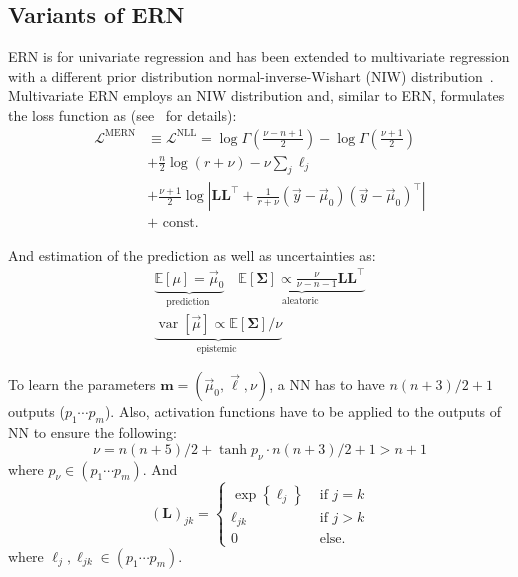 \subsection{Variants of ERN}
\label{sec:back:variant}
ERN is for univariate regression and has been extended to multivariate regression with a different prior distribution normal-inverse-Wishart (NIW) distribution~\cite{meinert2021multivariate}. Multivariate ERN employs an NIW distribution and, similar to ERN, formulates the loss function as (see~\citeauthor{meinert2021multivariate} for details):
\begin{equation}
\begin{aligned}
\mathcal{L}^{\mathrm{MERN}} & \equiv  \mathcal{L}^{\mathrm{NLL}}=  \log \Gamma\left(\frac{\nu-n+1}{2}\right)-\log \Gamma\left(\frac{\nu+1}{2}\right) \\
& +\frac{n}{2} \log \left(r+\nu\right)-\nu \sum_j \ell_j \\
& +\frac{\nu+1}{2} \log \left|\boldsymbol{L} \boldsymbol{L}^{\top}+\frac{1}{r+\nu}\left(\vec{y}-\vec{\mu}_{0}\right)\left(\vec{y}-\vec{\mu}_{0}\right)^{\top}\right| \\
& +\text { const. }
\end{aligned}
\end{equation}

And estimation of the prediction as well as uncertainties as:
\begin{equation}
\begin{gathered}
\underbrace{\mathbb{E}[\mu]=\vec{\mu}_{0}}_{\text {prediction }} \quad 
\underbrace{\mathbb{E}[\boldsymbol{\Sigma}] \propto \frac{\nu}{\nu-n-1} \boldsymbol{L} \boldsymbol{L}^{\top}}_{\text {aleatoric }}  \\
\underbrace{\operatorname{var}[\vec{\mu}] \propto \mathbb{E}[\boldsymbol{\Sigma}] / \nu}_{\text {epistemic }}
\end{gathered}
\end{equation}

To learn the parameters $\boldsymbol{m}=\left(\vec{\mu}_{0}, \vec{\ell}, \nu\right)$, a NN has to have  $n(n+3) / 2+1$ outputs ($p_{1} \cdots p_{m}$). Also, activation functions have to be applied to the outputs of NN to ensure the following:
\begin{equation}
    \nu = n(n+5)/2+\tanh p_{\nu} \cdot  n(n+3)/2  + 1 > n+1
\end{equation}
where $p_{\nu} \in (p_{1} \cdots p_{m})$. And
\begin{equation}
\left(\boldsymbol{L}\right)_{j k}= \begin{cases}\exp \left\{\ell_j\right\} & \text { if } j=k \\ \ell_{j k} & \text { if } j>k \\ 0 & \text { else. }\end{cases}
\end{equation}
where $\ell_j, \ell_{j k} \in (p_{1} \cdots p_{m})$.

